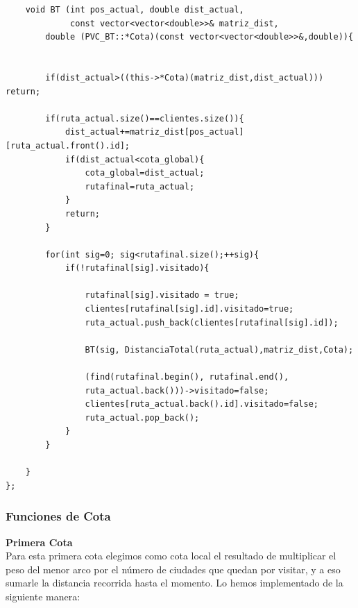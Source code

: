 \documentclass[a4paper,12pt,twoside]{article} %
\begin{document}
\begin{lstlisting}
    void BT (int pos_actual, double dist_actual, 
             const vector<vector<double>>& matriz_dist, 
        double (PVC_BT::*Cota)(const vector<vector<double>>&,double)){


        if(dist_actual>((this->*Cota)(matriz_dist,dist_actual))) return;

        if(ruta_actual.size()==clientes.size()){
            dist_actual+=matriz_dist[pos_actual][ruta_actual.front().id];
            if(dist_actual<cota_global){
                cota_global=dist_actual;
                rutafinal=ruta_actual;
            }
            return;
        }

        for(int sig=0; sig<rutafinal.size();++sig){
            if(!rutafinal[sig].visitado){

                rutafinal[sig].visitado = true;
                clientes[rutafinal[sig].id].visitado=true;
                ruta_actual.push_back(clientes[rutafinal[sig].id]);

                BT(sig, DistanciaTotal(ruta_actual),matriz_dist,Cota);

                (find(rutafinal.begin(), rutafinal.end(),
                ruta_actual.back()))->visitado=false;
                clientes[ruta_actual.back().id].visitado=false;
                ruta_actual.pop_back();
            }
        }

    }
};

\end{lstlisting}

\vspace{1cm}

\subsubsection{Funciones de Cota}
\vspace{0.3cm}

\textbf{Primera Cota}\\

 Para esta primera cota elegimos como cota local el resultado de multiplicar el peso del menor arco por el número de ciudades que quedan por visitar, y a eso sumarle la distancia recorrida hasta el momento. Lo hemos implementado de la siguiente manera:\\
\end{document}
